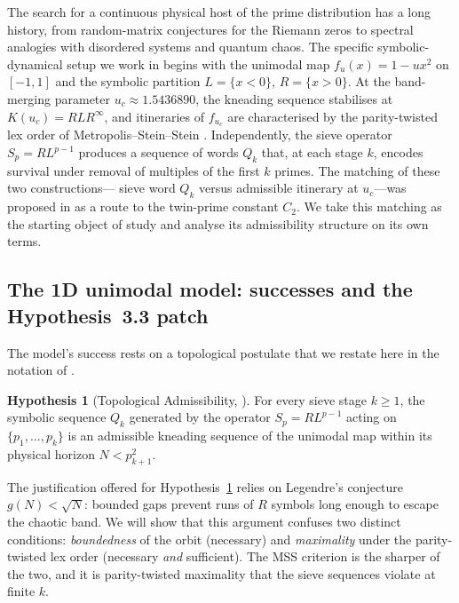 \documentclass{iopjournal}
\theoremstyle{definition}
\newtheorem{hypothesis}{Hypothesis}
\begin{document}
The search for a continuous physical host of the prime distribution
has a long history, from random-matrix conjectures for the Riemann
zeros to spectral analogies with disordered systems and quantum chaos.
The specific symbolic-dynamical setup we work in begins with the
unimodal map $f_u(x) = 1 - u x^2$ on $[-1, 1]$ and the symbolic
partition $L = \{x < 0\}$, $R = \{x > 0\}$. At the band-merging
parameter $u_c \approx 1.5436890$, the kneading sequence stabilises at
$K(u_c) = RLR^\infty$, and itineraries of $f_{u_c}$ are characterised
by the parity-twisted lex order of Metropolis--Stein--Stein
\cite{metropolis1973finite,milnor1988iterated}. Independently, the
sieve operator $S_p = R L^{p-1}$ produces a sequence of words $Q_k$
that, at each stage $k$, encodes survival under removal of multiples
of the first $k$ primes. The matching of these two constructions---
sieve word $Q_k$ versus admissible itinerary at $u_c$---was proposed
in \cite{wang2026emergence} as a route to the twin-prime constant
$C_2$. We take this matching as the starting object of study and
analyse its admissibility structure on its own terms.

\subsection{The 1D unimodal model: successes and the Hypothesis~3.3 patch}

The model's success rests on a topological postulate that we restate
here in the notation of \cite{wang2026emergence}.

\begin{hypothesis}[Topological Admissibility, \cite{wang2026emergence}]
\label{hyp:33}
For every sieve stage $k \geq 1$, the symbolic sequence $Q_k$ generated
by the operator $S_p = R L^{p-1}$ acting on $\{p_1, \ldots, p_k\}$ is an
admissible kneading sequence of the unimodal map within its physical
horizon $N < p_{k+1}^2$.
\end{hypothesis}

The justification offered for Hypothesis~\ref{hyp:33} relies on
Legendre's conjecture $g(N) < \sqrt{N}$: bounded gaps prevent runs of
$R$ symbols long enough to escape the chaotic band. We will show that
this argument confuses two distinct conditions: \emph{boundedness} of
the orbit (necessary) and \emph{maximality} under the parity-twisted
lex order (necessary \emph{and} sufficient). The MSS criterion is the
sharper of the two, and it is parity-twisted maximality that the sieve
sequences violate at finite $k$.
\end{document}
